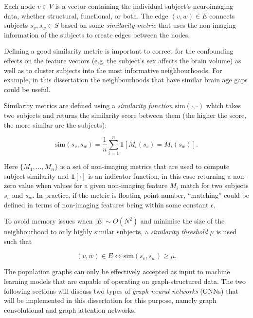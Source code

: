 Each node $v \in V$ is a vector containing the individual subject's neuroimaging data, whether structural, functional, or both. The edge $(v, w) \in E$ connects subjects $s_v, s_w \in S$ based on some \textit{similarity metric} that uses the non-imaging information of the subjects to create edges between the nodes. 

Defining a good similarity metric is important to correct for the confounding effects on the feature vectors (e.g. the subject's sex affects the brain volume) as well as to cluster subjects into the most informative neighbourhoods. For example, in this dissertation the neighbourhoods that have similar brain age gaps could be useful.

Similarity metrics are defined using a \textit{similarity function} $\mathrm{sim}(\cdot, \cdot)$ which takes two subjects and returns the similarity score between them (the higher the score, the more similar are the subjects):

\begin{equation}
    \mathrm{sim}(s_v, s_w) = \frac{1}{n}\sum_{i=1}^{n} \mathbf{1}[M_i(s_v) = M_i(s_w)].
    \label{eq:similarity}
\end{equation}

Here $\{M_1, \dots, M_n\}$ is a set of non-imaging metrics that are used to compute subject similarity and $\mathbf{1}[\cdot]$ is an indicator function, in this case returning a non-zero value when values for a given non-imaging feature $M_i$ match for two subjects $s_v$ and $s_w$. In practice, if the metric is floating-point number, ``matching'' could be defined in terms of non-imaging features being within some constant $\epsilon$. 

To avoid memory issues when $|E| \sim O(N^2)$ and minimise the size of the neighbourhood to only highly similar subjects, a \textit{similarity threshold} $\mu$ is used such that

\begin{equation}
    (v, w) \in E \iff \mathrm{sim}(s_v, s_w) \geq \mu.
    \label{eq:similarity-threshold}
\end{equation}

The population graphs can only be effectively accepted as input to machine learning models that are capable of operating on graph-structured data. The two following sections will discuss two types of \textit{graph neural networks} (GNNs) that will be implemented in this dissertation for this purpose, namely graph convolutional and graph attention networks.

